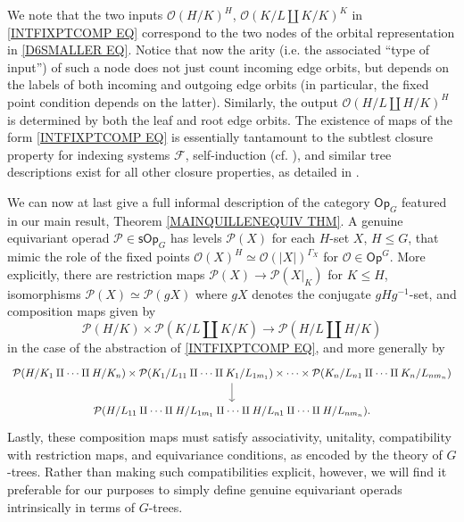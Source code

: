 \documentclass[a4paper,10pt
,draft
]{article}%
\numberwithin{equation}{section}
\numberwithin{figure}{section}
\theoremstyle{definition} %
\renewcommand{\O}{\ensuremath{\mathcal O}}
\renewcommand{\P}{\ensuremath{\mathcal P}}
\newcommand{\1}{\ensuremath{\mathbbm 1}}%
\begin{document}
We note that the two inputs 
$\O(H/K)^{H}$, $\O(K/L \amalg K/K)^{K}$ in
\eqref{INTFIXPTCOMP EQ}
correspond to the two nodes of the orbital representation
in \eqref{D6SMALLER EQ}.
Notice that now the arity (i.e. the associated ``type of input'')
of such a node does not just count incoming edge orbits,
but depends on the labels of both incoming and outgoing edge orbits
(in particular, the fixed point condition depends on the latter).
%
Similarly, the output 
$\O(H/L \amalg H/K)^{H}$
is determined by both the leaf and root edge orbits.
The existence of maps of the form \eqref{INTFIXPTCOMP EQ} is essentially tantamount to the subtlest 
closure property for indexing systems $\mathcal{F}$,
self-induction (cf. \cite[Def. 3.20]{BH15}),
and similar tree descriptions exist for all other closure properties, as detailed in 
\cite[\S 9]{Pe17}.

We can now at last give a full informal description of the category $\mathsf{Op}_G$ featured in 
our main result, Theorem \ref{MAINQUILLENEQUIV THM}.
A genuine equivariant operad
$\mathcal{P} \in \mathsf{sOp}_G$
has levels $\mathcal{P}(X)$ for each $H$-set $X$, $H\leq G$, 
that mimic the role of the fixed points $\O(X)^H \simeq \O(|X|)^{\Gamma_X}$ for 
$\mathcal{O} \in \mathsf{Op}^G$.
More explicitly, there are restriction maps 
$\mathcal{P}(X) \to \mathcal{P}(X|_{K})$ for $K \leq H$,
isomorphisms
$\mathcal{P}(X)\simeq \mathcal{P}(g X)$
where $gX$ denotes the conjugate $gHg^{-1}$-set,
and composition maps given by
\[
\P(H/K) \times \P(K/L \amalg K/K) \to \P(H/L \amalg H/K)
\]
in the case of the abstraction of \eqref{INTFIXPTCOMP EQ}, and more generally by
\begin{equation}\label{GENGENMULT EQ}
\begin{tikzcd}
  \mathcal{P}(H/K_1 \amalg \cdots \amalg H/K_n)
  \times
  \mathcal{P}(K_1 / L_{11} \amalg \cdots \amalg K_1/L_{1 m_1})
  \times \cdots \times
  \mathcal{P}(K_n / L_{n1} \amalg \cdots \amalg K_n / L_{n m_n})
  \arrow[d]
  \\
  \mathcal{P}(H / L_{11} \amalg \cdots \amalg H/L_{1 m_1}
  \amalg \cdots \amalg
  H / L_{n1} \amalg \cdots \amalg H/L_{n m_n}
  ).
\end{tikzcd}
\end{equation}
Lastly, these composition maps %
must satisfy associativity, unitality, compatibility with restriction maps, and equivariance conditions, as encoded by the theory of $G$-trees. 
Rather than making such compatibilities explicit, however, we will find it preferable for our purposes to simply define genuine equivariant operads intrinsically in terms of $G$-trees.
\end{document}
